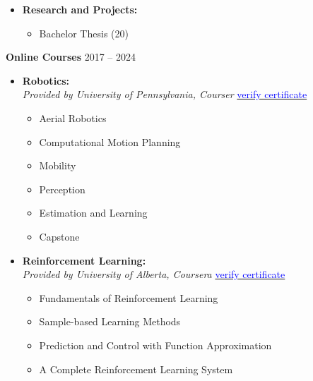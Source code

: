 \documentclass[12pt]{article}
\begin{document}
\begin{itemize}
    \item \textbf{Research and Projects:}\vspace{-4pt}
    \begin{multicols}{2}
    \begin{itemize}
        \item Bachelor Thesis (20)
    \end{itemize}
    \end{multicols}
\end{itemize}


\noindent
{\bfseries Online Courses} 
\hfill 2017 -- 2024\\

\begin{itemize} \itemsep -10pt
	\item \textbf{Robotics:} \\
	\textit{Provided by University of Pennsylvania, Courser} \hfill 
	\href{https://coursera.org/share/169250f50fb50f44b803162274217f86}{\textcolor{blue}{verify certificate}}
	\begin{multicols}{2}
		\begin{itemize}
			\item Aerial Robotics
			\item Computational Motion Planning
			\item Mobility
			\item Perception
			\item Estimation and Learning
			\item Capstone
		\end{itemize}
		\end{multicols}
	\item \textbf{Reinforcement Learning:} \\
	\textit{Provided by University of Alberta, Coursera} \hfill 
	\href{https://www.coursera.org/account/accomplishments/specialization/LWJMD8VB28PZ?utm_source=link&utm_medium=certificate&utm_content=cert_image&utm_campaign=sharing_cta&utm_product=s12n}{\textcolor{blue}{verify certificate}}
		\begin{itemize}
			\item Fundamentals of Reinforcement Learning
			\item Sample-based Learning Methods
			\item Prediction and Control with Function Approximation
			\item A Complete Reinforcement Learning System
		\end{itemize}

\end{itemize}
\end{document}
